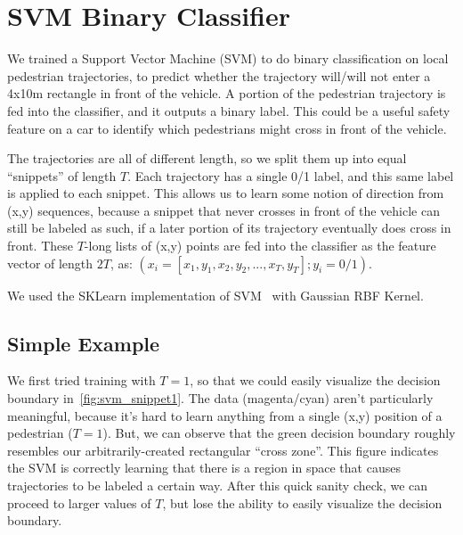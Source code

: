 
\section{SVM Binary Classifier} \label{sec:svm}

We trained a Support Vector Machine (SVM) to do binary classification on local pedestrian trajectories, to predict whether the trajectory will/will not enter a 4x10m rectangle in front of the vehicle.
A portion of the pedestrian trajectory is fed into the classifier, and it outputs a binary label.
This could be a useful safety feature on a car to identify which pedestrians might cross in front of the vehicle.

The trajectories are all of different length, so we split them up into equal ``snippets'' of length $T$.
Each trajectory has a single 0/1 label, and this same label is applied to each snippet.
This allows us to learn some notion of direction from (x,y) sequences, because a snippet that never crosses in front of the vehicle can still be labeled as such, if a later portion of its trajectory eventually does cross in front.
These $T$-long lists of (x,y) points are fed into the classifier as the feature vector of length $2T$, as:
$(x_i = [x_1, y_1, x_2, y_2, ... , x_T, y_T]; y_i = 0/1)$.

We used the SKLearn implementation of SVM~\cite{scikit-learn} with Gaussian RBF Kernel.

\subsection{Simple Example}
We first tried training with $T=1$, so that we could easily visualize the decision boundary in~\cref{fig:svm_snippet1}.
The data (magenta/cyan) aren't particularly meaningful, because it's hard to learn anything from a single (x,y) position of a pedestrian ($T=1$).
But, we can observe that the green decision boundary roughly resembles our arbitrarily-created rectangular ``cross zone''.
This figure indicates the SVM is correctly learning that there is a region in space that causes trajectories to be labeled a certain way.
After this quick sanity check, we can proceed to larger values of $T$, but lose the ability to easily visualize the decision boundary.

